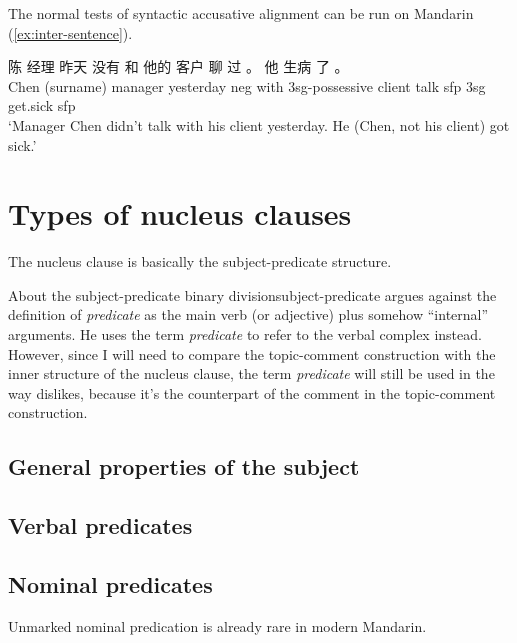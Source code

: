 \documentclass[UTF8, a4paper, oneside, scheme=plain, 12pt]{ctexrep}
\newcommand*{\term}[1]{\emph{#1}}
\newcommand{\translate}[1]{`#1'}
\begin{document}
The normal tests of syntactic accusative alignment can be run on Mandarin
(\ref{ex:inter-sentence}).

\begin{exe}
    \ex \gll 陈 经理 昨天 没有 和 他的 客户 聊 过 。 他 生病 了 。 \\
    {Chen (surname)} manager yesterday \acs{neg} with 3sg-\acs{possessive} client talk \acs{sfp}
    {} 3sg get.sick \acs{sfp} \\
    \glt \translate{Manager Chen didn't talk with his client yesterday. He (Chen, not his client) got sick.}
    \label{ex:inter-sentence}
\end{exe}


\section{Types of nucleus clauses}

The nucleus clause is basically the subject-predicate structure.

\begin{infobox}{About the subject-predicate binary division}{subject-predicate}
    \citet{dixon2009basic} argues against the definition of \term{predicate} 
    as the main verb (or adjective) plus somehow ``internal'' arguments.
    He uses the term \term{predicate} to refer to the verbal complex instead.
    However, since I will need to compare the topic-comment construction 
    with the inner structure of the nucleus clause,
    the term \term{predicate} will still be used in the way \citet{dixon2009basic} dislikes,
    because it's the counterpart of the comment in the topic-comment construction.
\end{infobox}

\subsection{General properties of the subject}

\subsection{Verbal predicates}

\subsection{Nominal predicates}

Unmarked nominal predication is already rare in modern Mandarin.
\end{document}
